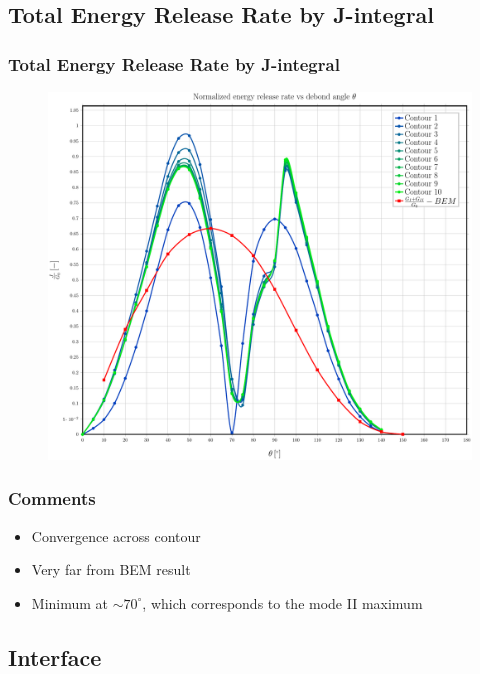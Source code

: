 \documentclass[first,firstsupp,lastsupp,handout,last,hyperref,table]{ETHclass}
\begin{document}
\subsection{Total Energy Release Rate by J-integral}

\begin{frame}
\frametitle{\vspace{0.35cm}\scriptsize Total Energy Release Rate by J-integral}
\vspace{-0.85cm}
\begin{figure}
\includegraphics[height=0.9\textheight]{2017-03-03_AbqRunSummary_JsoverG0_FEM-BEM-comparison.pdf}
\end{figure}
\end{frame}

\begin{frame}
\frametitle{Comments}
\vspace{-0.25cm}
\begin{itemize}[label=]
\item Convergence across contour
\item Very far from BEM result
\item Minimum at $\sim 70^{\circ}$, which corresponds to the mode II maximum
\end{itemize}
\end{frame}

\subsection{Interface}
\end{document}

